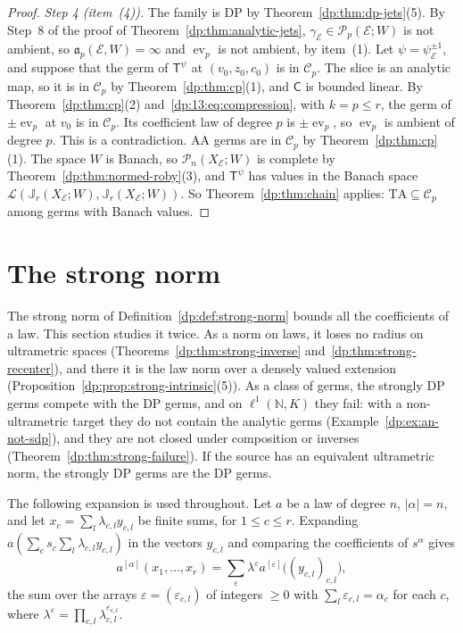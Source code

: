 \documentclass[11pt]{amsart}
\theoremstyle{definition}
\theoremstyle{remark}
\numberwithin{equation}{section}
\newcommand{\N}{\mathbb N}
\newcommand{\cL}{\mathcal L}
\newcommand{\abs}[1]{\lvert #1\rvert}
\newcommand{\cC}{\mathcal{C}}
\theoremstyle{plain}
\theoremstyle{definition}
\theoremstyle{plain}
\newcommand{\ev}{\operatorname{ev}}
\newcommand{\cP}{\mathcal P}
\begin{document}
\begin{proof}
\emph{Step 4 (item~(4)).} The family is DP by Theorem~\ref{dp:thm:dp-jets}(5). By Step~8 of the proof of Theorem~\ref{dp:thm:analytic-jets}, $\gamma_{\mathcal E}\in\cP_p(\mathcal E;W)$ is not ambient, so $\mathfrak a_p(\mathcal E,W)=\infty$ and $\ev_p$ is not ambient, by item~(1). Let $\psi=\psi_{\mathcal E}^{\pm1}$, and suppose that the germ of $\mathsf T^\psi$ at $(v_0,z_0,c_0)$ is in $\cC_p$. The slice is an analytic map, so it is in $\cC_p$ by Theorem~\ref{dp:thm:cp}(1), and $\mathsf C$ is bounded linear. By Theorem~\ref{dp:thm:cp}(2) and~\eqref{dp:13:eq:compression}, with $k=p\le r$, the germ of $\pm\ev_p$ at $v_0$ is in $\cC_p$. Its coefficient law of degree $p$ is $\pm\ev_p$, so $\ev_p$ is ambient of degree $p$. This is a contradiction. AA germs are in $\cC_p$ by Theorem~\ref{dp:thm:cp}(1). The space $W$ is Banach, so $\cP_n(X_{\mathcal E};W)$ is complete by Theorem~\ref{dp:thm:normed-roby}(3), and $\mathsf T^\psi$ has values in the Banach space $\cL(\mathbb J_r(X_{\mathcal E};W),\mathbb J_r(X_{\mathcal E};W))$. So Theorem~\ref{dp:thm:chain} applies: $\mathrm{TA}\subseteq\cC_p$ among germs with Banach values.
\end{proof}
\section{The strong norm}\label{dp:sec:strong}

The strong norm of Definition~\ref{dp:def:strong-norm} bounds all the coefficients of a law. This section studies it twice. As a norm on laws, it loses no radius on ultrametric spaces (Theorems~\ref{dp:thm:strong-inverse} and~\ref{dp:thm:strong-recenter}), and there it is the law norm over a densely valued extension (Proposition~\ref{dp:prop:strong-intrinsic}(5)). As a class of germs, the strongly DP germs compete with the DP germs, and on $\ell^1(\N,K)$ they fail: with a non-ultrametric target they do not contain the analytic germs (Example~\ref{dp:ex:an-not-sdp}), and they are not closed under composition or inverses (Theorem~\ref{dp:thm:strong-failure}). If the source has an equivalent ultrametric norm, the strongly DP germs are the DP germs.

The following expansion is used throughout. Let $a$ be a law of degree $n$, $\abs\alpha=n$, and let $x_c=\sum_l\lambda_{c,l}y_{c,l}$ be finite sums, for $1\le c\le r$. Expanding $a(\sum_cs_c\sum_l\lambda_{c,l}y_{c,l})$ in the vectors $y_{c,l}$ and comparing the coefficients of $s^\alpha$ gives
\begin{equation}\label{dp:s:eq:slots}
 a^{[\alpha]}(x_1,\dots,x_r)=\sum_\varepsilon\lambda^\varepsilon a^{[\varepsilon]}\bigl((y_{c,l})_{c,l}\bigr),
\end{equation}
the sum over the arrays $\varepsilon=(\varepsilon_{c,l})$ of integers $\ge0$ with $\sum_l\varepsilon_{c,l}=\alpha_c$ for each $c$, where $\lambda^\varepsilon=\prod_{c,l}\lambda_{c,l}^{\varepsilon_{c,l}}$.
\end{document}
